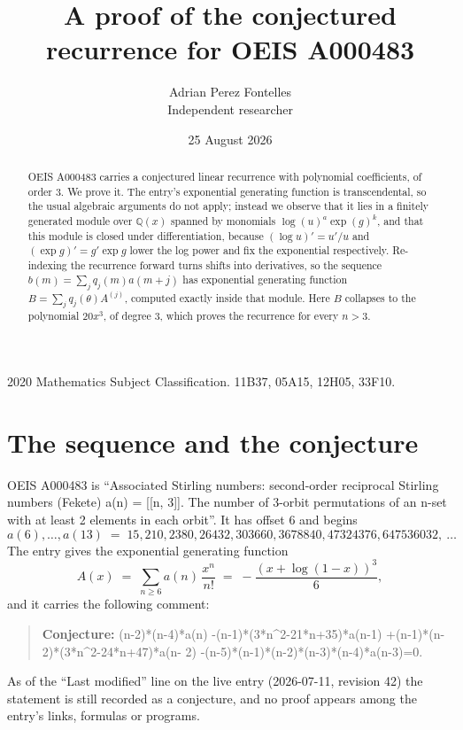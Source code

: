 \documentclass[11pt,a4paper]{article}
\title{A proof of the conjectured recurrence for OEIS A000483}
\author{Adrian Perez Fontelles\\ \small Independent researcher}
\date{25 August 2026}
\theoremstyle{plain}
\theoremstyle{definition}
\begin{document}
\maketitle

\begin{abstract}
OEIS A000483 carries a conjectured linear recurrence with polynomial coefficients, of
order 3. We prove it. The entry's exponential generating function is
transcendental, so the usual algebraic arguments do not apply; instead we observe that it
lies in a finitely generated module over $\mathbb{Q}(x)$ spanned by monomials
$\log(u)^{a}\exp(g)^{k}$, and that this module is closed under differentiation, because
$(\log u)'=u'/u$ and $(\exp g)'=g'\exp g$ lower the log power and fix the exponential
respectively. Re-indexing the recurrence forward turns shifts into derivatives, so the
sequence $b(m)=\sum_{j}q_{j}(m)a(m+j)$ has exponential generating function
$B=\sum_{j}q_{j}(\theta)A^{(j)}$, computed exactly inside that module. Here $B$ collapses
to the polynomial $20 x^{3}$, of degree $3$, which proves the recurrence for every
$n>3$.
\end{abstract}

\noindent\small 2020 Mathematics Subject Classification. 11B37, 05A15, 12H05, 33F10.\normalsize

\section{The sequence and the conjecture}

OEIS A000483 is ``Associated Stirling numbers: second-order reciprocal Stirling numbers (Fekete) a(n) = [[n, 3]]. The number of 3-orbit permutations of an n-set with at least 2 elements in each orbit''. It has offset $6$ and begins
\[
a(6),\dots,a(13)\;=\;15, 210, 2380, 26432, 303660, 3678840, 47324376, 647536032,\ \dots
\]
The entry gives the exponential generating function
\begin{equation}\label{eq:gf}
A(x)\;=\;\sum_{n\ge 6} a(n)\,\frac{x^{n}}{n!}\;=\;- \frac{\left(x + \log{\left(1 - x \right)}\right)^{3}}{6} ,
\end{equation}
and it carries the following comment:
\begin{quote}\small
\textbf{Conjecture:} (n-2)*(n-4)*a(n) -(n-1)*(3*n\textasciicircum{}2-21*n+35)*a(n-1) +(n-1)*(n-2)*(3*n\textasciicircum{}2-24*n+47)*a(n- 2) -(n-5)*(n-1)*(n-2)*(n-3)*(n-4)*a(n-3)=0.
\end{quote}
As of the ``Last modified'' line on the live entry (2026-07-11, revision 42) the
statement is still recorded as a conjecture, and no proof appears among the entry's links,
formulas or programs.
\end{document}
